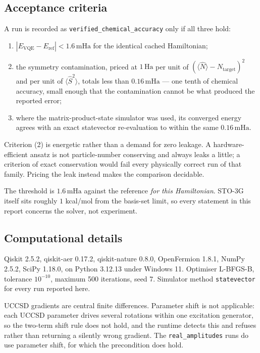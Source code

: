 \documentclass[11pt,a4paper]{article}
\newcommand{\mHa}{\ensuremath{\,\mathrm{mHa}}}
\newcommand{\Ha}{\ensuremath{\,\mathrm{Ha}}}
\newcommand{\Ssq}{\ensuremath{\langle \hat{S}^2 \rangle}}
\newcommand{\Nop}{\ensuremath{\langle \hat{N} \rangle}}
\newcommand{\code}[1]{\texttt{\small #1}}
\begin{document}
\subsection{Acceptance criteria}
\label{sec:criteria}

A run is recorded as \code{verified\_chemical\_accuracy} only if all three hold:

\begin{enumerate}[leftmargin=1.4em,itemsep=0.15em]
\item $|E_{\mathrm{VQE}} - E_{\mathrm{ref}}| < 1.6\mHa$ for the identical
  cached Hamiltonian;
\item the symmetry contamination, priced at $1\Ha$ per unit of
  $(\Nop - N_{\mathrm{target}})^2$ and per unit of \Ssq, totals less than
  $0.16\mHa$ --- one tenth of chemical accuracy, small enough that the
  contamination cannot be what produced the reported error;
\item where the matrix-product-state simulator was used, its converged energy
  agrees with an exact statevector re-evaluation to within the same
  $0.16\mHa$.
\end{enumerate}

Criterion (2) is energetic rather than a demand for zero leakage. A
hardware-efficient ansatz is not particle-number conserving and always leaks a
little; a criterion of exact conservation would fail every physically correct
run of that family. Pricing the leak instead makes the comparison decidable.

\begin{caution}
The threshold is $1.6\mHa$ against the reference \emph{for this Hamiltonian}.
STO-3G itself sits roughly $1$ kcal/mol from the basis-set limit, so every
statement in this report concerns the solver, not experiment.
\end{caution}

\subsection{Computational details}

Qiskit 2.5.2, qiskit-aer 0.17.2, qiskit-nature 0.8.0, OpenFermion 1.8.1, NumPy
2.5.2, SciPy 1.18.0, on Python 3.12.13 under Windows 11. Optimiser L-BFGS-B,
tolerance $10^{-10}$, maximum 500 iterations, seed 7. Simulator method
\code{statevector} for every run reported here.

UCCSD gradients are central finite differences. Parameter shift is not
applicable: each UCCSD parameter drives several rotations within one excitation
generator, so the two-term shift rule does not hold, and the runtime detects
this and refuses rather than returning a silently wrong gradient. The
\code{real\_amplitudes} runs do use parameter shift, for which the precondition
does hold.
\end{document}
